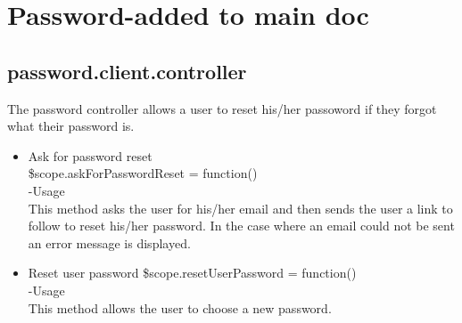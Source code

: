 \documentclass[a4paper,12pt]{article}
\begin{document}
 \section{Password-added to main doc}
 \subsection{password.client.controller}
 The password controller allows a user to reset his/her passoword if they forgot what their password is. 
 \begin{itemize}
\item Ask for password reset\\
  \$scope.askForPasswordReset = function()\\
 -Usage\\
 This method asks the user for his/her email and then sends the user a link to follow to reset his/her password. In the case where an email could not be sent an error message is displayed.
 \item Reset user password
  \$scope.resetUserPassword = function()\\
 -Usage\\
 This method allows the user to choose a new password.
 \end{itemize}
\end{document}
